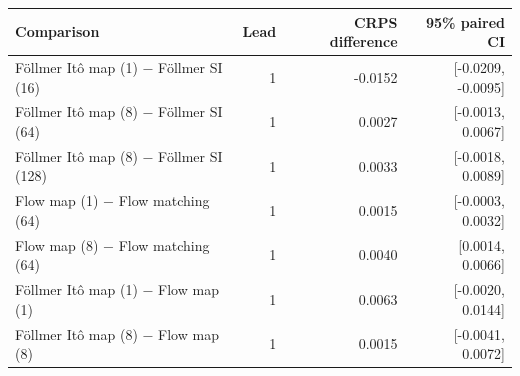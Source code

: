 \begin{tabular}{lrrr}
\toprule
Comparison & Lead & CRPS difference & 95\% paired CI \\
\midrule
Föllmer Itô map (1) $-$ Föllmer SI (16) & 1 & -0.0152 & [-0.0209, -0.0095] \\
Föllmer Itô map (8) $-$ Föllmer SI (64) & 1 & 0.0027 & [-0.0013, 0.0067] \\
Föllmer Itô map (8) $-$ Föllmer SI (128) & 1 & 0.0033 & [-0.0018, 0.0089] \\
Flow map (1) $-$ Flow matching (64) & 1 & 0.0015 & [-0.0003, 0.0032] \\
Flow map (8) $-$ Flow matching (64) & 1 & 0.0040 & [0.0014, 0.0066] \\
Föllmer Itô map (1) $-$ Flow map (1) & 1 & 0.0063 & [-0.0020, 0.0144] \\
Föllmer Itô map (8) $-$ Flow map (8) & 1 & 0.0015 & [-0.0041, 0.0072] \\
\bottomrule
\end{tabular}
